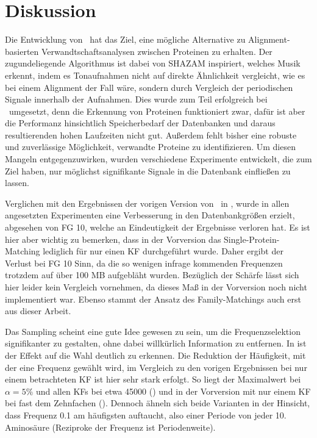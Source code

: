 \section{Diskussion} %
    \label{sec:diskussion}
    Die Entwicklung von \protfin\ hat das Ziel, eine mögliche Alternative zu Alignment-basierten Verwandtschaftsanalysen zwischen Proteinen zu erhalten. Der zugundeliegende Algorithmus ist dabei von SHAZAM inspiriert, welches Musik erkennt, indem es Tonaufnahmen nicht auf direkte Ähnlichkeit vergleicht, wie es bei einem Alignment der Fall wäre, sondern durch Vergleich der periodischen Signale innerhalb der Aufnahmen. Dies wurde zum Teil erfolgreich bei \protfin\ umgesetzt, denn die Erkennung von Proteinen funktioniert zwar, dafür ist aber die Performanz hinsichtlich Speicherbedarf der Datenbanken und daraus resultierenden hohen Laufzeiten nicht gut. Außerdem fehlt bisher eine robuste und zuverlässige Möglichkeit, verwandte Proteine zu identifizieren. Um diesen Mangeln entgegenzuwirken, wurden \NumWord{\theexperiment} verschiedene Experimente entwickelt, die zum Ziel haben, nur möglichst signifikante Signale in die Datenbank einfließen zu lassen.

    Verglichen mit den Ergebnissen der vorigen Version von \protfin\ in , wurde in allen angesetzten Experimenten eine Verbesserung in den Datenbankgrößen erzielt, abgesehen von \acf{FG} 10, welche an Eindeutigkeit der Ergebnisse verloren hat. Es ist hier aber wichtig zu bemerken, dass in der Vorversion das Single-Protein-Matching lediglich für nur einen \acf{KF} durchgeführt wurde. Daher ergibt der Verlust bei \ac{FG} 10 Sinn, da die so wenigen infrage kommenden Frequenzen trotzdem auf über 100 \acs{MB} aufgebläht wurden. Bezüglich der Schärfe lässt sich hier leider kein Vergleich vornehmen, da dieses Maß in der Vorversion noch nicht implementiert war. Ebenso stammt der Ansatz des Family-Matchings auch erst aus dieser Arbeit.

    Das Sampling scheint eine gute Idee gewesen zu sein, um die Frequenzselektion signifikanter zu gestalten, ohne dabei willkürlich Information zu entfernen. In  ist der Effekt auf die Wahl deutlich zu erkennen. Die Reduktion der Häufigkeit, mit der eine Frequenz gewählt wird, im Vergleich zu den vorigen Ergebnissen bei nur einem betrachteten \ac{KF} ist hier sehr stark erfolgt. So liegt der Maximalwert bei $\alpha=5\%$ und allen \acp{KF} bei etwa 45000 () und in der Vorversion mit nur einem \ac{KF} bei fast dem Zehnfachen (). Dennoch ähneln sich beide Varianten in der Hinsicht, dass Frequenz 0.1 am häufigsten auftaucht, also einer Periode von jeder 10. Aminosäure (Reziproke der Frequenz ist Periodenweite).

